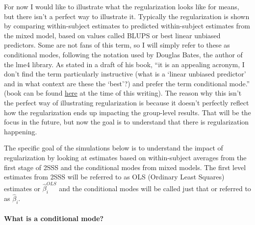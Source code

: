 \documentclass[]{book}
\let\oldparagraph\paragraph
\renewcommand{\paragraph}[1]{\oldparagraph{#1}\mbox{}}
\begin{document}
For now I would like to illustrate what the regularization looks like
for means, but there isn't a perfect way to illustrate it. Typically the
regularization is shown by comparing within-subject estimates to
predicted within-subject estimates from the mixed model, based on values
called BLUPS or best linear unbiased predictors. Some are not fans of
this term, so I will simply refer to these as conditional modes,
following the notation used by Douglas Bates, the author of the lme4
library. As stated in a draft of his book, ``it is an appealing acronym,
I don't find the term particularly instructive (what is a `linear
unbiased predictor' and in what context are these the `best'?) and
prefer the term conditional mode.'' (book can be found
\href{http://webcom.upmf-grenoble.fr/LIP/Perso/DMuller/M2R/R_et_Mixed/documents/Bates-book.pdf}{here}
at the time of this writing). The reason why this isn't the perfect way
of illustrating regularization is because it doesn't perfectly reflect
how the regularization ends up impacting the group-level results. That
will be the focus in the future, but now the goal is to understand that
there is regularization happening.

The specific goal of the simulations below is to understand the impact
of regularization by looking at estimates based on within-subject
averages from the first stage of 2SSS and the conditional modes from
mixed models. The first level estimates from 2SSS will be referred to as
OLS (Ordinary Least Squares) estimates or \(\hat\beta_i^{OLS}\) and the
conditional modes will be called just that or referred to as
\(\hat\beta_i\).

\paragraph{What is a conditional
mode?}\label{what-is-a-conditional-mode}
\end{document}
